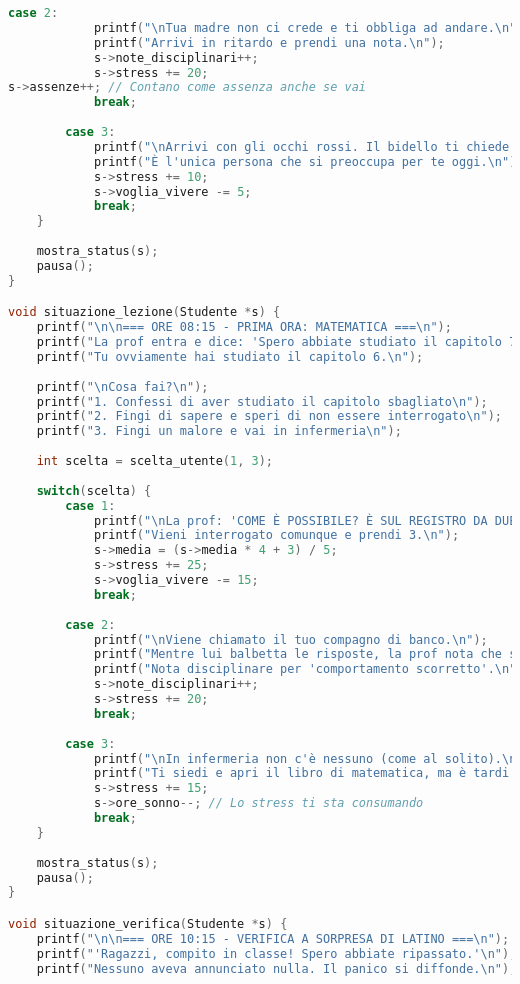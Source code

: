 \documentclass[a4paper,12pt]{article}
\begin{document}
\begin{lstlisting}[language=C, caption=Codice completo (file Capolavoro2.c)]
        case 2:
            printf("\nTua madre non ci crede e ti obbliga ad andare.\n");
            printf("Arrivi in ritardo e prendi una nota.\n");
            s->note_disciplinari++;
            s->stress += 20;
s->assenze++; // Contano come assenza anche se vai
            break;
            
        case 3:
            printf("\nArrivi con gli occhi rossi. Il bidello ti chiede se va tutto bene.\n");
            printf("È l'unica persona che si preoccupa per te oggi.\n");
            s->stress += 10;
            s->voglia_vivere -= 5;
            break;
    }
    
    mostra_status(s);
    pausa();
}

void situazione_lezione(Studente *s) {
    printf("\n\n=== ORE 08:15 - PRIMA ORA: MATEMATICA ===\n");
    printf("La prof entra e dice: 'Spero abbiate studiato il capitolo 7'.\n");
    printf("Tu ovviamente hai studiato il capitolo 6.\n");
    
    printf("\nCosa fai?\n");
    printf("1. Confessi di aver studiato il capitolo sbagliato\n");
    printf("2. Fingi di sapere e speri di non essere interrogato\n");
    printf("3. Fingi un malore e vai in infermeria\n");
    
    int scelta = scelta_utente(1, 3);
    
    switch(scelta) {
        case 1:
            printf("\nLa prof: 'COME È POSSIBILE? È SUL REGISTRO DA DUE SETTIMANE!'\n");
            printf("Vieni interrogato comunque e prendi 3.\n");
            s->media = (s->media * 4 + 3) / 5;
            s->stress += 25;
            s->voglia_vivere -= 15;
            break;
            
        case 2:
            printf("\nViene chiamato il tuo compagno di banco.\n");
            printf("Mentre lui balbetta le risposte, la prof nota che stai leggendo sotto il banco.\n");
            printf("Nota disciplinare per 'comportamento scorretto'.\n");
            s->note_disciplinari++;
            s->stress += 20;
            break;
            
        case 3:
            printf("\nIn infermeria non c'è nessuno (come al solito).\n");
            printf("Ti siedi e apri il libro di matematica, ma è tardi per recuperare.\n");
            s->stress += 15;
            s->ore_sonno--; // Lo stress ti sta consumando
            break;
    }
    
    mostra_status(s);
    pausa();
}

void situazione_verifica(Studente *s) {
    printf("\n\n=== ORE 10:15 - VERIFICA A SORPRESA DI LATINO ===\n");
    printf("'Ragazzi, compito in classe! Spero abbiate ripassato.'\n");
    printf("Nessuno aveva annunciato nulla. Il panico si diffonde.\n");
    

\end{lstlisting}
\end{document}
